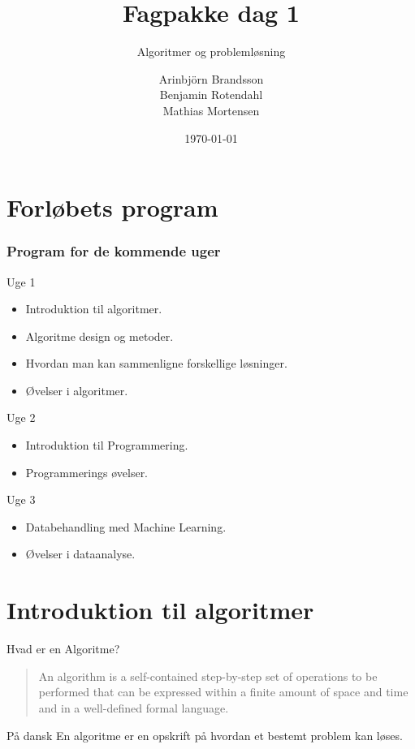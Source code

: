 \documentclass[12pt,t]{beamer}
\title{Fagpakke dag 1}
\subtitle{Algoritmer og problemløsning}
\author{
        Arinbjörn Brandsson \\
        Benjamin Rotendahl  \\
        Mathias Mortensen
}
\date[]{\today}
\begin{document}
\frame[plain]{\titlepage}
 \frame{\tableofcontents}

\section{Forløbets program}

\begin{frame}
    \frametitle{Program for de kommende uger}
    \begin{block}{Uge 1}
        \begin{itemize}
            \item Introduktion til algoritmer.
            \item Algoritme design og metoder.
            \item Hvordan man kan sammenligne forskellige løsninger.
            \item Øvelser i algoritmer.
        \end{itemize}
    \end{block}
    \pause
    \begin{block}{Uge 2}
        \begin{itemize}
            \item Introduktion til Programmering.
            \item Programmerings øvelser.
        \end{itemize}
    \end{block}
    \pause
    \begin{block}{Uge 3}
        \begin{itemize}
            \item Databehandling med Machine Learning.
            \item Øvelser i dataanalyse.
        \end{itemize}
    \end{block}
\end{frame}


\section{Introduktion til algoritmer}
    \begin{frame}[c]{Hvad er en Algoritme?}
        \begin{quote}
            An algorithm is a self-contained step-by-step set of operations to
            be performed that can be expressed within a finite amount of space
            and time and in a well-defined formal language.
        \end{quote}
        \pause
        \begin{block}{På dansk}
            En algoritme er en \alert{opskrift} på hvordan et bestemt problem
            kan løses.
        \end{block}
    \end{frame}
\end{document}
